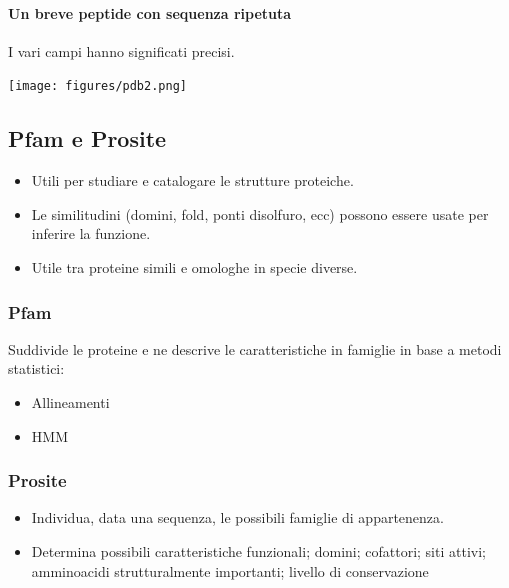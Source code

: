 \documentclass{article}
\begin{document}
\paragraph{Un breve peptide con sequenza ripetuta} I vari campi hanno significati precisi.
\begin{center}
    \texttt{[image: figures/pdb2.png]}
\end{center}
\subsection{Pfam e Prosite}
\begin{itemize}
    \item Utili per studiare e catalogare le strutture proteiche.
    \item Le similitudini (domini, fold, ponti disolfuro, ecc) possono
    essere usate per inferire la funzione.
    \item Utile tra proteine simili e omologhe in specie diverse.
\end{itemize}
\subsubsection{Pfam}
Suddivide le proteine e ne descrive le caratteristiche in famiglie in base a metodi statistici:
\begin{itemize}
    \item Allineamenti
    \item HMM
\end{itemize}
\subsubsection{Prosite}
\begin{itemize}
    \item Individua, data una sequenza, le possibili famiglie di appartenenza.
    \item Determina possibili caratteristiche funzionali; domini; cofattori; siti attivi; amminoacidi strutturalmente importanti; livello di conservazione
\end{itemize}
\end{document}
